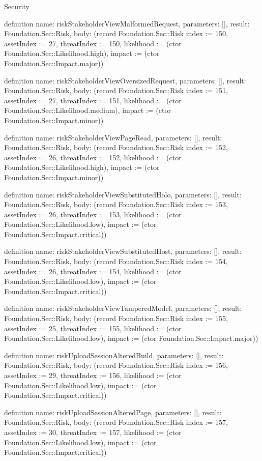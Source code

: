 \begin{lexlean}{Security}
\begin{semanticmodule}
definition{
  name: riskStakeholderViewMalformedRequest,
  parameters: [],
  result: Foundation.Sec::Risk,
  body: (record Foundation.Sec::Risk {index := 150, assetIndex := 27, threatIndex := 150, likelihood := (ctor Foundation.Sec::Likelihood.high), impact := (ctor Foundation.Sec::Impact.major)})
}

definition{
  name: riskStakeholderViewOversizedRequest,
  parameters: [],
  result: Foundation.Sec::Risk,
  body: (record Foundation.Sec::Risk {index := 151, assetIndex := 27, threatIndex := 151, likelihood := (ctor Foundation.Sec::Likelihood.medium), impact := (ctor Foundation.Sec::Impact.minor)})
}

definition{
  name: riskStakeholderViewPageRead,
  parameters: [],
  result: Foundation.Sec::Risk,
  body: (record Foundation.Sec::Risk {index := 152, assetIndex := 26, threatIndex := 152, likelihood := (ctor Foundation.Sec::Likelihood.high), impact := (ctor Foundation.Sec::Impact.minor)})
}

definition{
  name: riskStakeholderViewSubstitutedHolo,
  parameters: [],
  result: Foundation.Sec::Risk,
  body: (record Foundation.Sec::Risk {index := 153, assetIndex := 26, threatIndex := 153, likelihood := (ctor Foundation.Sec::Likelihood.low), impact := (ctor Foundation.Sec::Impact.critical)})
}

definition{
  name: riskStakeholderViewSubstitutedHost,
  parameters: [],
  result: Foundation.Sec::Risk,
  body: (record Foundation.Sec::Risk {index := 154, assetIndex := 26, threatIndex := 154, likelihood := (ctor Foundation.Sec::Likelihood.low), impact := (ctor Foundation.Sec::Impact.critical)})
}

definition{
  name: riskStakeholderViewTamperedModel,
  parameters: [],
  result: Foundation.Sec::Risk,
  body: (record Foundation.Sec::Risk {index := 155, assetIndex := 25, threatIndex := 155, likelihood := (ctor Foundation.Sec::Likelihood.low), impact := (ctor Foundation.Sec::Impact.major)})
}

definition{
  name: riskUploadSessionAlteredBuild,
  parameters: [],
  result: Foundation.Sec::Risk,
  body: (record Foundation.Sec::Risk {index := 156, assetIndex := 29, threatIndex := 156, likelihood := (ctor Foundation.Sec::Likelihood.low), impact := (ctor Foundation.Sec::Impact.critical)})
}

definition{
  name: riskUploadSessionAlteredPage,
  parameters: [],
  result: Foundation.Sec::Risk,
  body: (record Foundation.Sec::Risk {index := 157, assetIndex := 30, threatIndex := 157, likelihood := (ctor Foundation.Sec::Likelihood.low), impact := (ctor Foundation.Sec::Impact.critical)})
}


\end{semanticmodule}
\end{lexlean}
